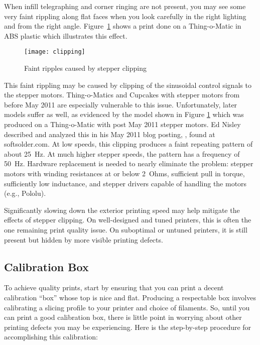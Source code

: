 When infill telegraphing and corner ringing are not present, you may
see some very faint rippling along flat faces when you look carefully
in the right lighting and from the right angle.  Figure~\ref{fig:clipping}
shows a print done on a Thing-o-Matic in ABS plastic which illustrates
this effect.

\begin{figure}[!htbp]
  \centering
    \texttt{[image: clipping]}
    \caption{Faint ripples caused by stepper clipping}
  \label{fig:clipping}
\end{figure}

This faint rippling may be caused by clipping of the sinusoidal control
signals to the stepper
motors.  Thing-o-Matics and Cupcakes with stepper motors from before
May 2011 are especially vulnerable to this issue.  Unfortunately, later
models suffer as well, as evidenced by the model shown in Figure \ref{fig:clipping} which was
produced on a Thing-o-Matic with post May 2011 stepper motors. Ed
Nisley described and analyzed this in his May 2011 blog posting,
, found
at softsolder.com.  At low speeds, this clipping produces a faint
repeating pattern of about 25~Hz. At much higher stepper speeds, the pattern
has a frequency of 50~Hz. Hardware replacement is needed to nearly
eliminate the problem: stepper motors with winding resistances at or
below 2~Ohms, sufficient pull in torque, sufficiently low inductance,
and stepper drivers capable of handling the motors (e.g.,
Pololu).

Significantly slowing down the exterior printing speed may help mitigate
the effects of stepper clipping.  On well-designed and tuned printers,
this is often the one remaining print quality issue.  On suboptimal
or untuned printers, it is still present but hidden by more visible
printing defects.


\subsection{Calibration Box} \label{sec:cube}

To achieve quality prints, start by ensuring that you can print a decent
calibration ``box'' whose top is nice and flat.  Producing a respectable box
involves calibrating a slicing profile to your printer and choice of
filaments.  So, until you can print a good calibration box, there is little
point in worrying about other printing defects you may be
experiencing.  Here is the step-by-step procedure for
accomplishing this calibration:


